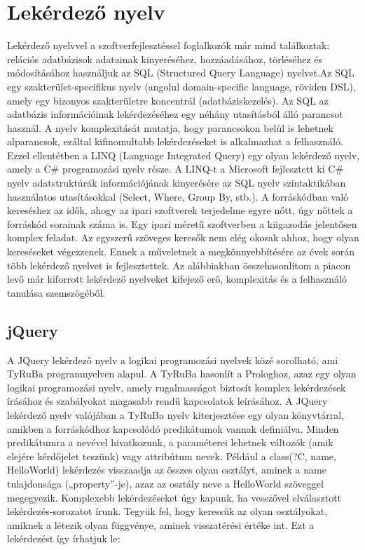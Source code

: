 \documentclass[a4paper,12pt]{report}
\begin{document}
\chapter{Lekérdező nyelv}
Lekérdező nyelvvel a szoftverfejlesztéssel foglalkozók már mind találkoztak: relációs adatbázisok adatainak kinyeréséhez, hozzáadásához, törléséhez és módosításához használjuk az SQL (Structured Query Language) nyelvet.Az SQL egy szakterület-specifikus nyelv (angolul domain-specific language, röviden DSL), amely egy bizonyos szakterületre koncentrál (adatbáziskezelés). Az SQL az adatbázis információinak lekérdezéséhez egy néhány utasításból álló parancsot használ. A nyelv komplexitását mutatja, hogy parancsokon belül is lehetnek alparancsok, ezáltal kifinomultabb lekérdezéseket is alkalmazhat a felhasználó. Ezzel ellentétben a LINQ (Language Integrated Query) egy olyan lekérdező nyelv, amely a C\# programozási nyelv része. A LINQ-t a Microsoft fejlesztett ki C\# nyelv adatstruktúrák információjának kinyerésére az SQL nyelv szintaktikában használatos utasításokkal (Select, Where, Group By, stb.). A forráskódban való kereséshez az idők, ahogy az ipari szoftverek terjedelme egyre nőtt, úgy nőttek a forráskód sorainak száma is. Egy ipari méretű szoftverben a kiigazodás jelentősen komplex feladat. Az egyszerű szöveges keresők nem elég okosak ahhoz, hogy olyan kereséseket végezzenek. Ennek a műveletnek a megkönnyebbítésére az évek során több lekérdező nyelvet is fejlesztettek. Az alábbiakban összehasonlítom a piacon levő már kiforrott lekérdező nyelveket kifejező erő, komplexitás és a felhasználó tanulása szemszögéből.

\section{jQuery}
A JQuery lekérdező nyelv a logikai programozási nyelvek közé sorolható, ami TyRuBa programnyelven alapul. A TyRuBa hasonlít a Prologhoz, azaz egy olyan logikai programozási nyelv, amely rugalmasságot biztosít komplex lekérdezések írásához és szabályokat magasabb rendű kapcsolatok leírásához. A JQuery lekérdező nyelv valójában a TyRuBa nyelv kiterjesztése egy olyan könyvtárral, amikben a forráskódhoz kapcsolódó predikátumok vannak definiálva. Minden predikátumra a nevével hivatkozunk, a paraméterei lehetnek változók (amik elejére kérdőjelet teszünk) vagy attribútum nevek. Például a class(?C, name, HelloWorld) lekérdezés visszaadja az összes olyan osztályt, aminek a name tulajdonsága („property”-je), azaz az osztály neve a HelloWorld szöveggel megegyezik. Komplexebb lekérdezéseket úgy kapunk, ha vesszővel elválasztott lekérdezés-sorozatot írunk. Tegyük fel, hogy keressük az olyan osztályokat, amiknek a létezik olyan függvénye, aminek visszatérési értéke int. Ezt a lekérdezést így írhatjuk le:
\end{document}
